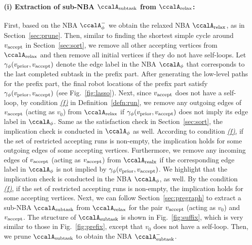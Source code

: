 \documentclass[Afour,sageh,times]{sagej}
\newcommand{\auto}[1]{\ccalA_{\textup{#1}}}
\newcommand{\autop}{\ccalA_{\phi}}
\newcommand{\vertex}[1]{v_{\textup{#1}}}
\begin{document}
{{{  \paragraph{(i) Extraction of sub-NBA $\auto{subtask}$ from $\auto{relax}$:} First, based on the NBA $\autop^-$ we obtain the relaxed NBA $\auto{relax}$, as in Section~\ref{sec:prune}.  Then, similar to finding the shortest simple cycle around $\vertex{accept}$ in Section~\ref{sec:sort}, we remove all other accepting vertices from $\auto{relax}$ and then remove all initial vertices if they do not have self-loops. Let $\gamma_{\phi}(\vertex{prior}, \vertex{accept})$ denote the edge label in the NBA $\autop$ that corresponds to the last completed subtask in the prefix part. After generating the low-level paths for the prefix part, the final robot locations of the prefix part satisfy $\gamma_{\phi}(\vertex{prior}, \vertex{accept})$ (see Fig.~\ref{fig:lasso}).  Next, since $\vertex{accept}$ does not have a self-loop, by condition \hyperref[cond:f]{\it (f)} in Definition~\ref{defn:run}, we remove any outgoing edges of $\vertex{accept}$ (acting as $v_0$) from $\auto{relax}$ if $\gamma_{\phi}(\vertex{prior}, \vertex{accept})$ does not imply its edge label in $\autop$. Same as the satisfaction check in Section~\ref{sec:sort}, the implication check is conducted in $\autop$ as well. According to condition \hyperref[cond:f]{\it (f)}, if the set of restricted accepting runs is non-empty, the  implication holds  for some  outgoing edges of some accepting vertices.
  Furthermore, we remove any incoming edges of $\vertex{accept}$ (acting as $\vertex{accept}$) from $\auto{realx}$ if the corresponding edge label in $\autop$ is not implied by $\gamma_\phi(\vertex{prior}, \vertex{accept})$.  We highlight that the implication check is  conducted in the NBA $\autop$, as well. By the condition \hyperref[cond:f]{\it (f)}, if the set of restricted accepting runs is non-empty, the implication holds  for some accepting vertices.   Next, we can follow Section~\ref{sec:pregraph} to  extract a sub-NBA $\auto{subtask}$ from $\auto{relax}$ for the pair $\vertex{accept}$ (acting as $v_0$) and $\vertex{accept}$. The structure of $\auto{subtask}$ is shown in Fig.~\ref{fig:suffix}, which is very similar to those in Fig.~\ref{fig:prefix}, except that $v_0$ does not have a self-loop.  Then, we prune $\auto{subtask}$ to obtain the NBA $\auto{subtask}^-$.

}}}
\end{document}

